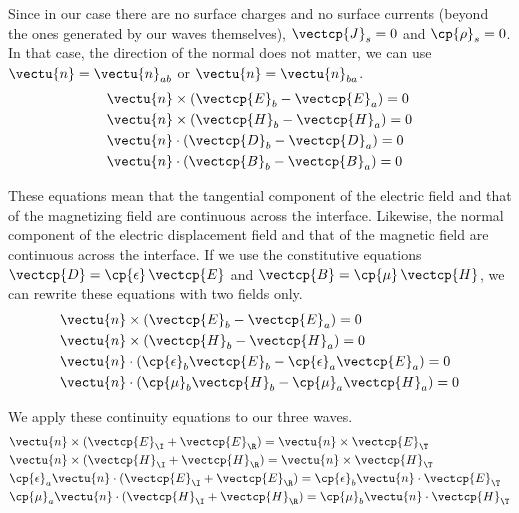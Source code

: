 Since in our case there are no surface charges and no surface currents (beyond the ones generated by our waves themselves), $\vectcp{J}_s=0$ and $\cp{\rho}_s=0$.
In that case, the direction of the normal does not matter, we can use $\vectu{n}=\vectu{n}_{ab}$ or $\vectu{n}=\vectu{n}_{ba}$.
\begin{align}
    &\vectu{n} \times (\vectcp{E}_b - \vectcp{E}_a) = 0 \\
    &\vectu{n} \times (\vectcp{H}_b - \vectcp{H}_a) = 0 \\
    &\vectu{n} \cdot  (\vectcp{D}_b - \vectcp{D}_a) = 0 \\
    &\vectu{n} \cdot  (\vectcp{B}_b - \vectcp{B}_a) = 0
\end{align}

These equations mean that the tangential component of the electric field and that of the magnetizing field are continuous across the interface.
Likewise, the normal component of the electric displacement field and that of the magnetic field are continuous across the interface.
If we use the constitutive equations $\vectcp{D}=\cp{\epsilon} \, \vectcp{E}$ and $\vectcp{B}=\cp{\mu} \, \vectcp{H}$, we can rewrite these equations with two fields only.
\begin{align}
    &\vectu{n} \times (\vectcp{E}_b - \vectcp{E}_a) = 0 \\
    &\vectu{n} \times (\vectcp{H}_b - \vectcp{H}_a) = 0 \\
    &\vectu{n} \cdot  (\cp{\epsilon}_b \vectcp{E}_b - \cp{\epsilon}_a \vectcp{E}_a) = 0 \\
    &\vectu{n} \cdot  (\cp{\mu}_b      \vectcp{H}_b - \cp{\mu}_a      \vectcp{H}_a) = 0
\end{align}

We apply these continuity equations to our three waves.
\begin{align}
    &\vectu{n} \times (\vectcp{E}_\I + \vectcp{E}_\R) = \vectu{n} \times \vectcp{E}_\T \\
    &\vectu{n} \times (\vectcp{H}_\I + \vectcp{H}_\R) = \vectu{n} \times \vectcp{H}_\T \\
    &\cp{\epsilon}_a \vectu{n} \cdot (\vectcp{E}_\I + \vectcp{E}_\R) =
     \cp{\epsilon}_b \vectu{n} \cdot \vectcp{E}_\T \\
    &\cp{\mu}_a \vectu{n} \cdot (\vectcp{H}_\I + \vectcp{H}_\R) =
     \cp{\mu}_b \vectu{n} \cdot \vectcp{H}_\T
\end{align}



